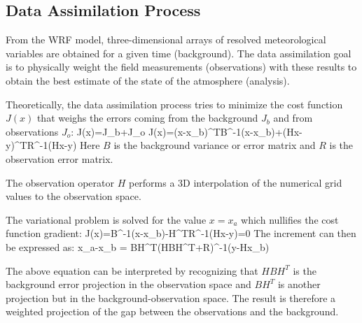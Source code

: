 \subsection{Data Assimilation Process}
From the WRF model, three-dimensional arrays of  resolved meteorological variables are obtained for a given time (background). The data assimilation goal is to physically weight the field measurements (observations) with these results to obtain the best estimate of the state of the atmosphere (analysis).

Theoretically, the data assimilation process tries to minimize the cost function $J(x)$ that weighs the errors coming from the background $J_b$ and from observations $J_o$:
\be
J(x)=J_b+J_o
\ee
\be 
J(x)=(x-x_b)^TB^{-1}(x-x_b)+(Hx-y)^TR^{-1}(Hx-y)
\ee
Here $B$ is the background variance or error matrix and $R$ is the observation error matrix.

The observation operator $H$ performs a 3D interpolation of the numerical grid values to the observation space.

The variational problem is solved for the value $x=x_a$ which nullifies the cost function gradient:
\be 
\nabla J(x)=B^{-1}(x-x_b)-H^TR^{-1}(Hx-y)=0
\ee
The increment can then be expressed as:
\be 
x_a-x_b = BH^T(HBH^T+R)^{-1}(y-Hx_b)
\ee

The above equation can be interpreted by recognizing that $HBH^T$ is the background error projection in the observation space and $BH^T$ is another projection but in the background-observation space. The result is therefore a weighted projection of the gap between the observations and the background.

